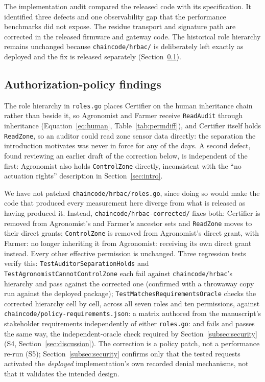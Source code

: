 \documentclass[a4paper,fleqn]{cas-sc}
\begin{document}
The implementation audit compared the released code with its specification.
It identified three defects and one observability gap that the performance
benchmarks did not expose. The residue transport and signature path are
corrected in the released firmware and gateway code. The historical role
hierarchy remains unchanged because
\texttt{chaincode/hrbac/} is deliberately left exactly as deployed and the
fix is released separately (Section~\ref{subsec:pm_policy}).

\subsection{Authorization-policy findings}
\label{subsec:pm_policy}

The role hierarchy in \texttt{roles.go} places Certifier on the human
inheritance chain rather than beside it, so Agronomist and Farmer receive
\texttt{ReadAudit} through inheritance (Equation~\eqref{eq:human},
Table~\ref{tab:permdiff}), and Certifier itself holds \texttt{ReadZone}, so
an auditor could read zone sensor data directly: the separation the
introduction motivates was never in force for any of the \DeployDays{}
days. A second defect, found reviewing an earlier draft of the correction
below, is independent of the first: Agronomist also holds
\texttt{ControlZone} directly, inconsistent with the ``no actuation
rights'' description in Section~\ref{sec:intro}.

We have not patched \texttt{chaincode/hrbac/roles.go}, since doing so
would make the code that produced every measurement here diverge from
what is released as having produced it. Instead,
\texttt{chaincode/hrbac-corrected/} fixes
both: Certifier is removed from Agronomist's and Farmer's ancestor sets
and \texttt{ReadZone} moves to their direct grants; \texttt{ControlZone}
is removed from Agronomist's direct grant, with Farmer: no longer
inheriting it from Agronomist: receiving its own direct grant instead.
Every other effective permission is unchanged. Three regression tests
verify this: \texttt{TestAuditorSeparationHolds} and
\texttt{TestAgronomistCannotControlZone} each fail against
\texttt{chaincode/hrbac}'s hierarchy and pass against the corrected one
(confirmed with a throwaway copy run against the deployed package);
\texttt{TestMatchesRequirementsOracle} checks the corrected hierarchy
cell by cell, across all seven roles and ten permissions, against
\texttt{chaincode/policy-requirements.json}: a matrix authored from the
manuscript's stakeholder requirements independently of either
\texttt{roles.go}: and fails and passes the same way, the
independent-oracle check required by Section~\ref{subsec:security}
(S4, Section~\ref{sec:discussion}). The correction is a policy patch,
not a performance re-run (S5); Section~\ref{subsec:security} confirms only
that the tested requests activated the \emph{deployed} implementation's
own recorded denial mechanisms, not that it validates the intended
design.
\end{document}
